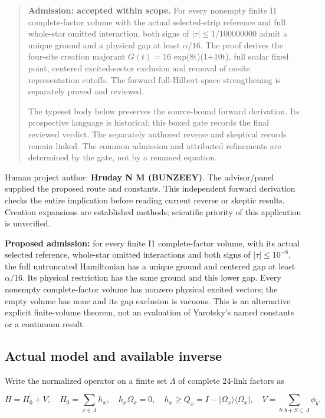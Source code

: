 \begin{quote}\small \textbf{Admission: accepted within scope.} For every nonempty finite I1 complete-factor volume with the actual selected-strip reference and full whole-star omitted interaction, both signs of \(|\tau|\le 1/100000000\) admit a unique ground and a physical gap at least \(\alpha/16\). The proof derives the four-site creation majorant \(G(t)=16\) exp(8t)(1+10t), full scalar fixed point, centered excited-sector exclusion and removal of onsite representation cutoffs. The forward full-Hilbert-space strengthening is separately proved and reviewed.\par The typeset body below preserves the source-bound forward derivation. Its prospective language is historical; this boxed gate records the final reviewed verdict. The separately authored reverse and skeptical records remain linked. The common admission and attributed refinements are determined by the gate, not by a renamed equation.\end{quote}
Human project author: \textbf{Hruday N M (BUNZEEY)}. The advisor/panel supplied the proposed route and constants. This independent forward derivation checks the entire implication before reading current reverse or skeptic results. Creation expansions are established methods; scientific priority of this application is unverified.

\textbf{Proposed admission:} for every finite I1 complete-factor volume, with its actual selected reference, whole-star omitted interactions and both signs of \(|\tau|\le 10^{-8}\), the full untruncated Hamiltonian has a unique ground and centered gap at least \(\alpha/16\). Its physical restriction has the same ground and this lower gap. Every nonempty complete-factor volume has nonzero physical excited vectors; the empty volume has none and its gap exclusion is vacuous. This is an alternative explicit finite-volume theorem, not an evaluation of Yarotsky's named constants or a continuum result.

\hypertarget{r29-am2-actual-model-and-available-inverse}{%
\subsection{Actual model and available inverse}\label{r29:am2:r29-am2-actual-model-and-available-inverse}}

Write the normalized operator on a finite set \(\Lambda\) of complete 24-link factors as

\begin{equation}
H=H_0+V,\quad H_0=\sum_{x\in\Lambda}h_x,\quad
h_x\Omega_x=0,\quad h_x\ge Q_x=I-|\Omega_x\rangle\langle\Omega_x|,
\quad V=\sum_{b:b+S\subset\Lambda}\phi_b .
\tag{HNM-AM2.1}
\label{r29:am2:eq1}
\end{equation}

